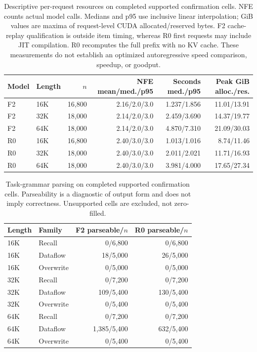 \begin{table}[t]
\centering\small
\begin{tabular}{@{}llrrrr@{}}
\toprule
Model & Length & $n$ & NFE mean/med./p95 & Seconds med./p95 & Peak GiB alloc./res. \\
\midrule
F2 & 16K & 16,800 & 2.16/2.0/3.0 & 1.237/1.856 & 11.01/13.91 \\
F2 & 32K & 18,000 & 2.14/2.0/3.0 & 2.459/3.690 & 14.37/19.77 \\
F2 & 64K & 18,000 & 2.14/2.0/3.0 & 4.870/7.310 & 21.09/30.03 \\
R0 & 16K & 16,800 & 2.40/3.0/3.0 & 1.013/1.016 & 8.74/11.46 \\
R0 & 32K & 18,000 & 2.40/3.0/3.0 & 2.011/2.021 & 11.71/16.93 \\
R0 & 64K & 18,000 & 2.40/3.0/3.0 & 3.981/4.000 & 17.65/27.34 \\
\bottomrule
\end{tabular}
\caption{Descriptive per-request resources on completed supported confirmation cells. NFE counts actual model calls. Medians and p95 use inclusive linear interpolation; GiB values are maxima of request-level CUDA allocated/reserved bytes. F2 cache-replay qualification is outside item timing, whereas R0 first requests may include JIT compilation. R0 recomputes the full prefix with no KV cache. These measurements do not establish an optimized autoregressive speed comparison, speedup, or goodput.}
\label{tab:e3-confirmation-resources}
\end{table}

\begin{table}[t]
\centering\small
\begin{tabular}{@{}llrr@{}}
\toprule
Length & Family & F2 parseable/$n$ & R0 parseable/$n$ \\
\midrule
16K & Recall & 0/6,800 & 0/6,800 \\
16K & Dataflow & 18/5,000 & 26/5,000 \\
16K & Overwrite & 0/5,000 & 0/5,000 \\
32K & Recall & 0/7,200 & 0/7,200 \\
32K & Dataflow & 109/5,400 & 130/5,400 \\
32K & Overwrite & 0/5,400 & 0/5,400 \\
64K & Recall & 0/7,200 & 0/7,200 \\
64K & Dataflow & 1,385/5,400 & 632/5,400 \\
64K & Overwrite & 0/5,400 & 0/5,400 \\
\bottomrule
\end{tabular}
\caption{Task-grammar parsing on completed supported confirmation cells. Parseability is a diagnostic of output form and does not imply correctness. Unsupported cells are excluded, not zero-filled.}
\label{tab:e3-confirmation-parsing}
\end{table}
